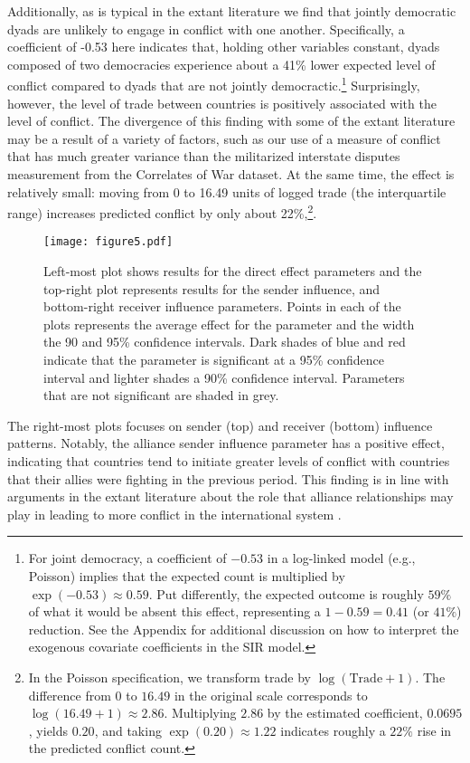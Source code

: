Additionally, as is typical in the extant literature we find that jointly democratic dyads are unlikely to engage in conflict with one another. Specifically, a coefficient of -0.53 here indicates that, holding other variables constant, dyads composed of two democracies experience about a 41\% lower expected level of conflict compared to dyads that are not jointly democractic.\footnote{For joint democracy, a coefficient of $-0.53$ in a log-linked model (e.g., Poisson) implies that the expected count is multiplied by $\exp(-0.53) \approx 0.59$. Put differently, the expected outcome is roughly $59\%$ of what it would be absent this effect, representing a $1-0.59 = 0.41$ (or $41\%$) reduction. See the Appendix for additional discussion on how to interpret the exogenous covariate coefficients in the SIR model.} Surprisingly, however, the level of trade between countries is positively associated with the level of conflict. The divergence of this finding with some of the extant literature may be a result of a variety of factors, such as our use of a measure of conflict that has much greater variance than the militarized interstate disputes measurement from the Correlates of War dataset. At the same time, the effect is relatively small: moving from 0 to 16.49 units of logged trade (the interquartile range) increases predicted conflict by only about 22\%,\footnote{In the Poisson specification, we transform trade by $\log(\mathrm{Trade} + 1)$. The difference from $0$ to $16.49$ in the original scale corresponds to $\log(16.49 + 1)\approx 2.86$. Multiplying $2.86$ by the estimated coefficient, $0.0695$, yields $0.20$, and taking $\exp(0.20)\approx 1.22$ indicates roughly a $22\%$ rise in the predicted conflict count.}.

\begin{figure}[ht]
	\centering
	\texttt{[image: figure5.pdf]}
	\caption{Left-most plot shows results for the direct effect parameters and the top-right plot represents results for the sender influence, and bottom-right receiver influence parameters. Points in each of the plots represents the average effect for the parameter and the width the 90 and 95\% confidence intervals. Dark shades of blue and red indicate that the parameter is significant at a 95\% confidence interval and lighter shades a 90\% confidence interval. Parameters that are not significant are shaded in grey.}
	\label{fig:correlConf}
\end{figure}
\FloatBarrier

The right-most plots focuses on sender (top) and receiver (bottom) influence patterns. Notably, the alliance sender influence parameter has a positive effect, indicating that countries tend to initiate greater levels of conflict with countries that their allies were fighting in the previous period. This finding is in line with arguments in the extant literature about the role that alliance relationships may play in leading to more conflict in the international system \citep{siverson:king:1980,leeds:2005}.

